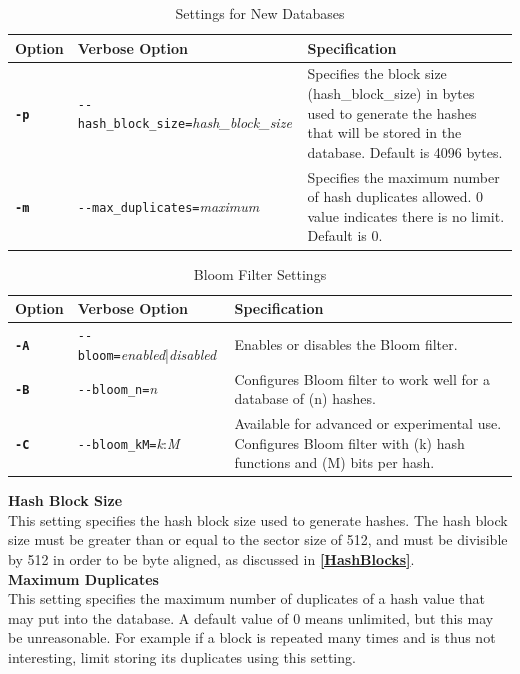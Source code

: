 \documentclass[11pt,fleqn]{article} %
\begin{document}
\begin{table}[!ht]
\centering
\caption{Settings for New Databases}
\label{tab:hashDBSettings}
\begin{tabular}{|p{1.5 cm}|p{8 cm}|p{4 cm}|}
\hline \hline
\textbf{Option} & \textbf{Verbose Option} & \textbf{Specification} \\
\hline
\textbf{\texttt{-p}} & \verb+--hash_block_size=+\textit{hash\_block\_size} & Specifies the block size (hash\_block\_size) in bytes used to generate the hashes that will be stored in the database. Default is 4096 bytes.  \\
\hline
\textbf{\texttt{-m}} & \verb+--max_duplicates=+\textit{maximum} & Specifies the maximum number of hash duplicates allowed. 0 value indicates there is no limit. Default is 0.\\
\hline
\end{tabular}
\end{table}

\begin{table}[!ht]
\centering
\caption{Bloom Filter Settings}
\label{tab:bloomSettings}
\begin{tabular}{|p{1.5 cm}|p{8 cm}|p{4 cm}|}
\hline \hline
\textbf{Option} & \textbf{Verbose Option} & \textbf{Specification} \\
\hline
\textbf{\texttt{-A}} & \verb+--bloom=+\textit{enabled}|\textit{disabled} & Enables or disables the Bloom filter.\\
\hline
\textbf{\texttt{-B}} & \verb+--bloom_n=+\textit{n} & Configures Bloom filter to work well for a database of (n) hashes.\\
\hline
\textbf{\texttt{-C}} & \verb+--bloom_kM=+\textit{k}:\textit{M} & Available for advanced or experimental use.  Configures Bloom filter with (k) hash functions and (M) bits per hash.\\
\hline
\end{tabular}
\end{table}

\textbf{Hash Block Size}\\
This setting specifies the hash block size used to generate hashes.
The hash block size must be greater than or equal to the sector size of 512,
and must be divisible by 512 in order to be byte aligned, as discussed
in \textbf{\autoref{HashBlocks}}.\\

\textbf{Maximum Duplicates}\\
This setting specifies the maximum number of duplicates of a hash value
that \hash may put into the database.
A default value of 0 means unlimited, but this may be unreasonable.
For example if a block is repeated many times and is thus not interesting,
limit storing its duplicates using this setting.\\
\end{document}
